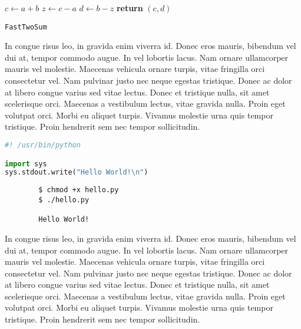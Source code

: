 \documentclass{article}
\begin{document}
\begin{center}
	\begin{minipage}{0.5\linewidth} %
		\begin{algorithm}[H]
			\medskip
			$c \leftarrow a + b$ \;
			$z \leftarrow c - a$ \;
			$d \leftarrow b - z$ \;
			{\bf return} $(c,d)$ \;
			\caption{\texttt{FastTwoSum}} %
			\label{alg:fastTwoSum}   %
		\end{algorithm}
	\end{minipage}
\end{center}

\begin{question}
	In congue risus leo, in gravida enim viverra id. Donec eros mauris, bibendum vel dui at, tempor commodo augue. In vel lobortis lacus. Nam ornare ullamcorper mauris vel molestie. Maecenas vehicula ornare turpis, vitae fringilla orci consectetur vel. Nam pulvinar justo nec neque egestas tristique. Donec ac dolor at libero congue varius sed vitae lectus. Donec et tristique nulla, sit amet scelerisque orci. Maecenas a vestibulum lectus, vitae gravida nulla. Proin eget volutpat orci. Morbi eu aliquet turpis. Vivamus molestie urna quis tempor tristique. Proin hendrerit sem nec tempor sollicitudin.
\end{question}


\begin{file}[hello.py]
\begin{lstlisting}[language=Python]
#! /usr/bin/python

import sys
sys.stdout.write("Hello World!\n")
\end{lstlisting}
\end{file}


\begin{commandline}
	\begin{verbatim}
		$ chmod +x hello.py
		$ ./hello.py

		Hello World!
	\end{verbatim}
\end{commandline}

\begin{warn}[Notice:]
  In congue risus leo, in gravida enim viverra id. Donec eros mauris, bibendum vel dui at, tempor commodo augue. In vel lobortis lacus. Nam ornare ullamcorper mauris vel molestie. Maecenas vehicula ornare turpis, vitae fringilla orci consectetur vel. Nam pulvinar justo nec neque egestas tristique. Donec ac dolor at libero congue varius sed vitae lectus. Donec et tristique nulla, sit amet scelerisque orci. Maecenas a vestibulum lectus, vitae gravida nulla. Proin eget volutpat orci. Morbi eu aliquet turpis. Vivamus molestie urna quis tempor tristique. Proin hendrerit sem nec tempor sollicitudin.
\end{warn}


{}

\end{document}
